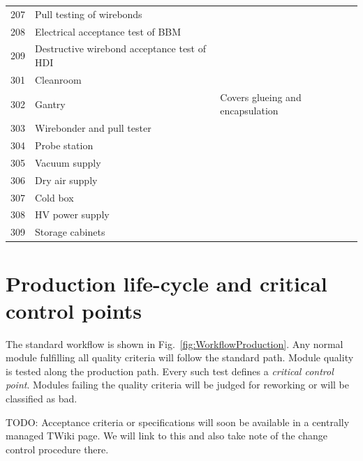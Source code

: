 \documentclass[12pt]{unlsilabsop}
\begin{document}
\begin{table}[hH]
\begin{center}
{\begin{tabular}{lp{7cm}p{6cm}}
207 & Pull testing of wirebonds & \\
208 & Electrical acceptance test of BBM & \\
209 & Destructive wirebond acceptance test of HDI & \\
\midrule
301 & Cleanroom & \\
302 & Gantry & Covers glueing and encapsulation \\
303 & Wirebonder and pull tester & \\
304 & Probe station & \\
305 & Vacuum supply & \\
306 & Dry air supply & \\
307 & Cold box & \\
308 & HV power supply & \\
309 & Storage cabinets & \\
\bottomrule
\end{tabular}
}
\end{center}
\end{table}

\section{Production life-cycle and critical control points}

The standard workflow is shown in Fig.~\ref{fig:WorkflowProduction}. Any normal module fulfilling all quality criteria will follow the standard path. Module quality is tested along the production path. Every such test defines a \emph{critical control point}. Modules failing the quality criteria will be judged for reworking or will be classified as bad.

TODO: Acceptance criteria or specifications will soon be available in a centrally managed TWiki page. We will link to this and also take note of the change control procedure there.
\end{document}
